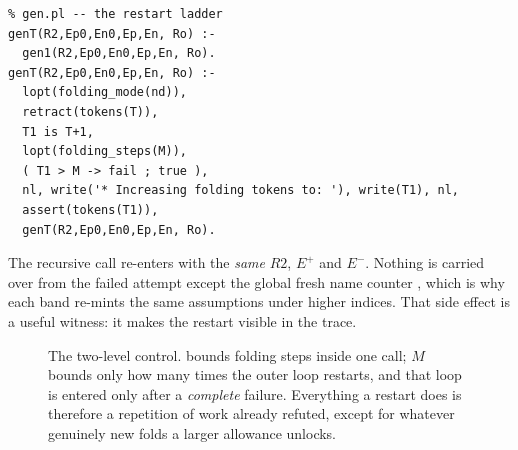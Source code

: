 \documentclass[11pt]{article}
\DeclareRobustCommand{\code}[1]{\texttt{\detokenize{#1}}}
\newcommand{\Epos}{E^{+}}
\newcommand{\Eneg}{E^{-}}
\begin{document}
\begin{lstlisting}
% gen.pl -- the restart ladder
genT(R2,Ep0,En0,Ep,En, Ro) :-
  gen1(R2,Ep0,En0,Ep,En, Ro).
genT(R2,Ep0,En0,Ep,En, Ro) :-
  lopt(folding_mode(nd)),
  retract(tokens(T)),
  T1 is T+1,
  lopt(folding_steps(M)),
  ( T1 > M -> fail ; true ),
  nl, write('* Increasing folding tokens to: '), write(T1), nl,
  assert(tokens(T1)),
  genT(R2,Ep0,En0,Ep,En, Ro).
\end{lstlisting}

The recursive call re-enters \code{genT} with the \emph{same} $R2$, $\Epos$ and
$\Eneg$. Nothing is carried over from the failed attempt except the global fresh
name counter \code{current_new_pred/1}, which is why each band re-mints the same
assumptions under higher indices. That side effect is a useful witness: it makes
the restart visible in the trace.

\begin{figure}[ht]
\centering
{}
\caption{The two-level control. \code{tokens(T)} bounds folding steps inside one
call; $M$ bounds only how many times the outer loop restarts, and that loop is
entered only after a \emph{complete} failure. Everything a restart does is
therefore a repetition of work already refuted, except for whatever genuinely
new folds a larger allowance unlocks.}
\label{fig:two-level}
\end{figure}
\end{document}
